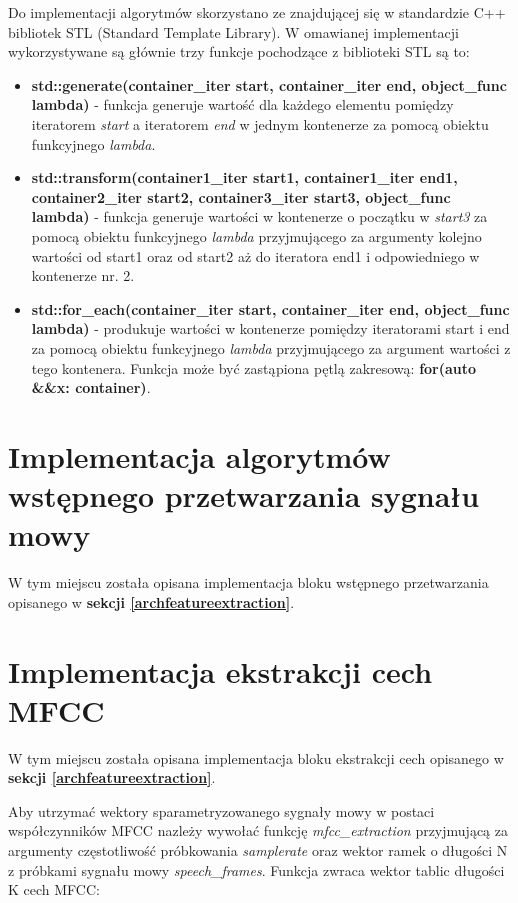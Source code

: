 Do implementacji algorytmów skorzystano ze znajdującej się w standardzie C++ bibliotek STL (Standard Template Library). W omawianej implementacji wykorzystywane są głównie trzy funkcje pochodzące z biblioteki STL są to:
\begin{itemize}
  \item{\textbf{std::generate(container\_iter start, container\_iter end, object\_func lambda)}} - funkcja generuje wartość dla każdego elementu pomiędzy iteratorem \textit{start} a iteratorem \textit{end} w jednym kontenerze za pomocą obiektu funkcyjnego \textit{lambda}.
  \item{\textbf{std::transform(container1\_iter start1, container1\_iter end1,
                       container2\_iter start2,
                       container3\_iter start3, object\_func lambda)}} 
  - funkcja generuje wartości w kontenerze o początku w \textit{start3} za pomocą obiektu funkcyjnego \textit{lambda} przyjmującego za argumenty kolejno wartości od start1 oraz od start2 aż do iteratora end1 i odpowiedniego w kontenerze nr. 2.
  \item{\textbf{std::for\_each(container\_iter start, container\_iter end, object\_func lambda)}} - produkuje wartości w kontenerze pomiędzy iteratorami start i end za pomocą obiektu funkcyjnego \textit{lambda} przyjmującego za argument wartości z tego kontenera. Funkcja może być zastąpiona pętlą zakresową: \textbf{for(auto \&\&x: container)}.

\end{itemize}

\section{Implementacja algorytmów wstępnego przetwarzania  sygnału mowy}

W tym miejscu została opisana implementacja bloku wstępnego przetwarzania opisanego w \textbf{sekcji \ref{archfeatureextraction}}.

\section{Implementacja ekstrakcji cech MFCC}

W tym miejscu została opisana implementacja bloku ekstrakcji cech opisanego w \textbf{sekcji \ref{archfeatureextraction}}.

Aby utrzymać wektory sparametryzowanego sygnały mowy w postaci współczynników MFCC nazleży wywołać funkcję \textit{mfcc\_extraction} przyjmującą za argumenty częstotliwość próbkowania \textit{samplerate} oraz wektor ramek o długości N z próbkami sygnału mowy \textit{speech\_frames}. Funkcja zwraca wektor tablic długości K cech MFCC:

